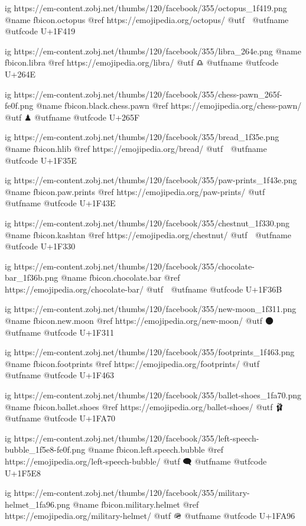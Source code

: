 	ig https://em-content.zobj.net/thumbs/120/facebook/355/octopus_1f419.png
	@name fbicon.octopus
	@ref https://emojipedia.org/octopus/
	@utf 🐙
	@utfname
	@utfcode U+1F419

	ig https://em-content.zobj.net/thumbs/120/facebook/355/libra_264e.png
	@name fbicon.libra
	@ref https://emojipedia.org/libra/
	@utf ♎
	@utfname
	@utfcode U+264E

	ig https://em-content.zobj.net/thumbs/120/facebook/355/chess-pawn_265f-fe0f.png
	@name fbicon.black.chess.pawn
	@ref https://emojipedia.org/chess-pawn/
	@utf ♟
	@utfname
	@utfcode U+265F

	ig https://em-content.zobj.net/thumbs/120/facebook/355/bread_1f35e.png
	@name fbicon.hlib
	@ref https://emojipedia.org/bread/
	@utf 🍞
	@utfname
	@utfcode U+1F35E

	ig https://em-content.zobj.net/thumbs/120/facebook/355/paw-prints_1f43e.png
	@name fbicon.paw.prints
	@ref https://emojipedia.org/paw-prints/
	@utf 🐾
	@utfname
	@utfcode U+1F43E

	ig https://em-content.zobj.net/thumbs/120/facebook/355/chestnut_1f330.png
	@name fbicon.kashtan
	@ref https://emojipedia.org/chestnut/
	@utf 🌰
	@utfname
	@utfcode U+1F330

	ig https://em-content.zobj.net/thumbs/120/facebook/355/chocolate-bar_1f36b.png
	@name fbicon.chocolate.bar
	@ref https://emojipedia.org/chocolate-bar/
	@utf 🍫
	@utfname
	@utfcode U+1F36B

	ig https://em-content.zobj.net/thumbs/120/facebook/355/new-moon_1f311.png
	@name fbicon.new.moon
	@ref https://emojipedia.org/new-moon/
	@utf 🌑
	@utfname
	@utfcode U+1F311

	ig https://em-content.zobj.net/thumbs/120/facebook/355/footprints_1f463.png
	@name fbicon.footprints
	@ref https://emojipedia.org/footprints/
	@utf 👣
	@utfname
	@utfcode U+1F463

	ig https://em-content.zobj.net/thumbs/120/facebook/355/ballet-shoes_1fa70.png
	@name fbicon.ballet.shoes
	@ref https://emojipedia.org/ballet-shoes/
	@utf 🩰
	@utfname
	@utfcode U+1FA70

	ig https://em-content.zobj.net/thumbs/120/facebook/355/left-speech-bubble_1f5e8-fe0f.png
	@name fbicon.left.speech.bubble
	@ref https://emojipedia.org/left-speech-bubble/
	@utf 🗨️
	@utfname
	@utfcode U+1F5E8

	ig https://em-content.zobj.net/thumbs/120/facebook/355/military-helmet_1fa96.png
	@name fbicon.military.helmet
	@ref https://emojipedia.org/military-helmet/
	@utf 🪖
	@utfname
	@utfcode U+1FA96

